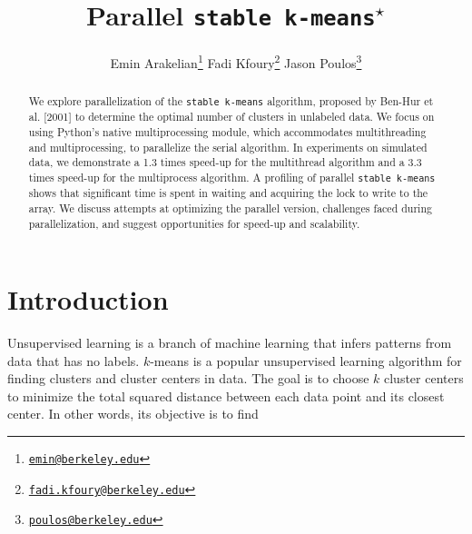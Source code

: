 \documentclass[10pt,twocolumn,letterpaper]{article}
\begin{document}
\title{Parallel \texttt{stable k-means}$^\star$}

\author{
    Emin Arakelian\thanks{\href{mailto:emin@berkeley.edu}{\nolinkurl{emin@berkeley.edu}}}
    \hspace{10mm}
    Fadi Kfoury\thanks{\href{mailto:fadi.kfoury@berkeley.edu}{\nolinkurl{fadi.kfoury@berkeley.edu}}}
    \hspace{10mm}
     Jason Poulos\thanks{\href{mailto:poulos@berkeley.edu}{\nolinkurl{poulos@berkeley.edu}}}
    \vspace{15mm}
}

\maketitle

\begin{abstract}
We explore parallelization of the \texttt{stable k-means} algorithm, proposed by Ben-Hur et al. [2001] to determine the optimal number of clusters in unlabeled data. We focus on using Python's native multiprocessing module, which accommodates multithreading and multiprocessing, to parallelize the serial algorithm. In experiments on simulated data, we demonstrate a 1.3 times speed-up for the multithread algorithm and a 3.3 times speed-up for the multiprocess algorithm. A profiling of parallel \texttt{stable k-means} shows that significant time is spent in waiting and acquiring the lock to write to the array. We discuss attempts at optimizing the parallel version, challenges faced during parallelization, and suggest opportunities for speed-up and scalability.  

\end{abstract}



\section{Introduction} \label{section:Intro}

Unsupervised learning is a branch of machine learning that infers patterns from data that has no labels. $k$-means is a popular unsupervised learning algorithm for finding clusters and cluster centers in data. The goal is to choose $k$ cluster centers to minimize the total squared distance between each data point and its closest center. In other words, its objective is to find
\end{document}
